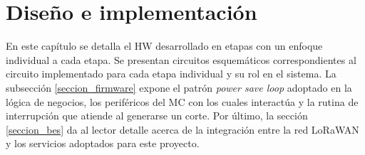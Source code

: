 \chapter{Diseño e implementación} %
\label{Chapter3} %
En este capítulo se detalla el HW desarrollado en etapas con un enfoque individual a cada etapa. Se presentan circuitos esquemáticos correspondientes al circuito implementado para cada etapa individual y su rol en el sistema. 
La subsección \ref{seccion_firmware} expone el patrón \textit{power save loop} adoptado en la lógica de negocios, los periféricos del MC con los cuales interactúa y la rutina de interrupción que atiende al generarse un corte.
Por último, la sección \ref{seccion_bes} da al lector detalle acerca de la integración entre la red LoRaWAN y los servicios adoptados para este proyecto.


